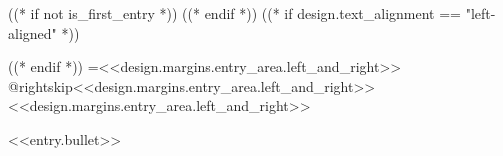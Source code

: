 ((* if not is_first_entry *))
\vspace{<<design.margins.entry_area.vertical_between>>}
((* endif *))
\begingroup((* if design.text_alignment == "left-aligned" *))\raggedright((* endif *))
\leftskip=<<design.margins.entry_area.left_and_right>>
\advance\csname @rightskip\endcsname <<design.margins.entry_area.left_and_right>>
\advance\rightskip <<design.margins.entry_area.left_and_right>>

\textbullet \hspace{3pt} <<entry.bullet>>
\par\endgroup

